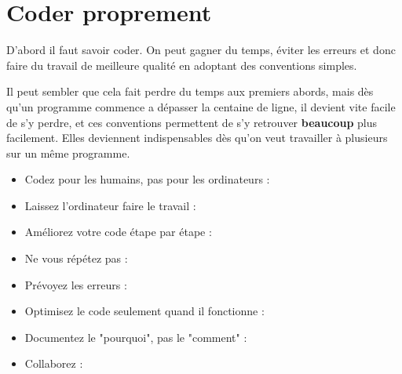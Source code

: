\documentclass{article}
\begin{document}






\section{Coder proprement}

D'abord il faut savoir coder. On peut gagner du temps, éviter les erreurs et donc faire du travail de meilleure qualité en adoptant des conventions simples.

Il peut sembler que cela fait perdre du temps aux premiers abords, mais dès qu'un programme commence a dépasser la centaine de ligne, il devient vite facile de s'y perdre, et ces conventions permettent de s'y retrouver \textbf{beaucoup} plus facilement. Elles deviennent indispensables dès qu'on veut travailler à plusieurs sur un même programme.

\begin{itemize}
    \item Codez pour les humains, pas pour les ordinateurs : 
    \item Laissez l'ordinateur faire le travail : 
    \item Améliorez votre code étape par étape :
    \item Ne vous répétez pas : 
    \item Prévoyez les erreurs : 
    \item Optimisez le code seulement quand il fonctionne : 
    \item Documentez le "pourquoi", pas le "comment" : 
    \item Collaborez : 
\end{itemize}
\end{document}
